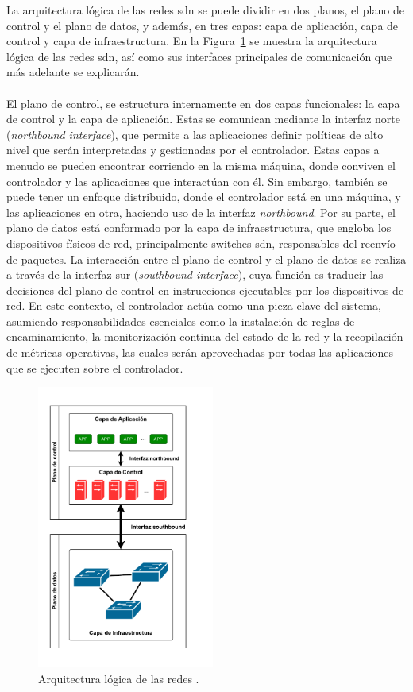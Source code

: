 La arquitectura lógica de las redes \gls{sdn} se puede dividir en dos planos, el plano de control y el plano de datos, y además, en tres capas: capa de aplicación, capa de control y capa de infraestructura. En la Figura~\ref{fig:sdn_architecture} se muestra la arquitectura lógica de las redes \gls{sdn}, así como sus interfaces principales de comunicación que más adelante se explicarán.\\
\\
El plano de control, se estructura internamente en dos capas funcionales: la capa de control y la capa de aplicación. Estas se comunican mediante la interfaz norte (\textit{northbound interface}), que permite a las aplicaciones definir políticas de alto nivel que serán interpretadas y gestionadas por el controlador. Estas capas a menudo se pueden encontrar corriendo en la misma máquina, donde conviven el controlador y las aplicaciones que interactúan con él. Sin embargo, también se puede tener un enfoque distribuido, donde el controlador está en una máquina, y las aplicaciones en otra, haciendo uso de la interfaz \textit{northbound}. Por su parte, el plano de datos está conformado por la capa de infraestructura, que engloba los dispositivos físicos de red, principalmente switches \gls{sdn}, responsables del reenvío de paquetes. La interacción entre el plano de control y el plano de datos se realiza a través de la interfaz sur (\textit{southbound interface}), cuya función es traducir las decisiones del plano de control en instrucciones ejecutables por los dispositivos de red. En este contexto, el controlador actúa como una pieza clave del sistema, asumiendo responsabilidades esenciales como la instalación de reglas de encaminamiento, la monitorización continua del estado de la red y la recopilación de métricas operativas, las cuales serán aprovechadas por todas las aplicaciones que se ejecuten sobre el controlador.

\begin{figure}[ht!]
\centering
\includegraphics[width=0.52\textwidth]{fig/02_sota/sota_2_sdn_arch_b.drawio.pdf}
\caption{Arquitectura lógica de las redes .}
\label{fig:sdn_architecture}
\end{figure}

